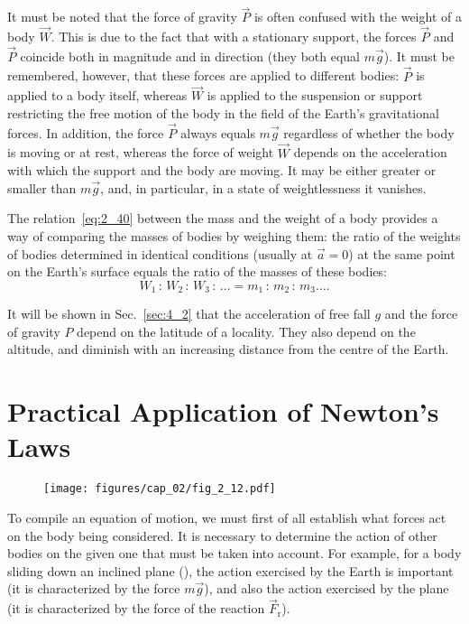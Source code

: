 It must be noted that the force of gravity $\vec{P}$ is often confused with the weight of a body $\vec{W}$. This is due to the fact that with a stationary support, the forces $\vec{P}$ and $\vec{P}$ coincide both in magnitude and in direction (they both equal $m\vec{g}$). It must be remembered, however, that these forces are applied to different bodies: $\vec{P}$ is applied to a body itself, whereas $\vec{W}$ is applied to the suspension or support restricting the free motion of the body in the field of the Earth's gravitational forces. In addition, the force $\vec{P}$ always equals $m\vec{g}$ regardless of whether the body is moving or at rest, whereas the force of weight $\vec{W}$ depends on the acceleration with which the support and the body are moving. It may be either greater or smaller than $m\vec{g}$, and, in particular, in a state of weightlessness it vanishes.

The relation~\eqref{eq:2_40} between the mass and the weight of a body provides a way of comparing the masses of bodies by weighing them: the ratio of the weights of bodies determined in identical conditions (usually at $\vec{a}=0$) at the same point on the Earth's surface equals the ratio of the masses of these bodies:
\begin{equation*}
W_1\,:\,W_2\,:\,W_3\,:\,\ldots = m_1\,:\,m_2\,:\,m_3\ldots.
\end{equation*}

It will be shown in Sec.~\ref{sec:4_2} that the acceleration of free fall $g$ and the force of gravity $P$ depend on the latitude of a locality. They also depend on the altitude, and diminish with an increasing distance from the centre of the Earth.

\section{Practical Application of Newton's Laws}\label{sec:2_12}

\begin{figure}[t]
	\begin{center}
		\texttt{[image: figures/cap\_02/fig\_2\_12.pdf]}
		\caption[]{}
		\label{fig:2_12}
	\end{center}
	\vspace{-0.7cm}
\end{figure}

To compile an equation of motion, we must first of all establish what forces act on the body being considered. It is necessary to determine the action of other bodies on the given one that must be taken into account. For example, for a body sliding down an inclined plane (), the action exercised by the Earth is important (it is characterized by the force $m\vec{g}$), and also the action exercised by the plane (it is characterized by the force of the reaction $\vec{F}_{\text{r}}$).

